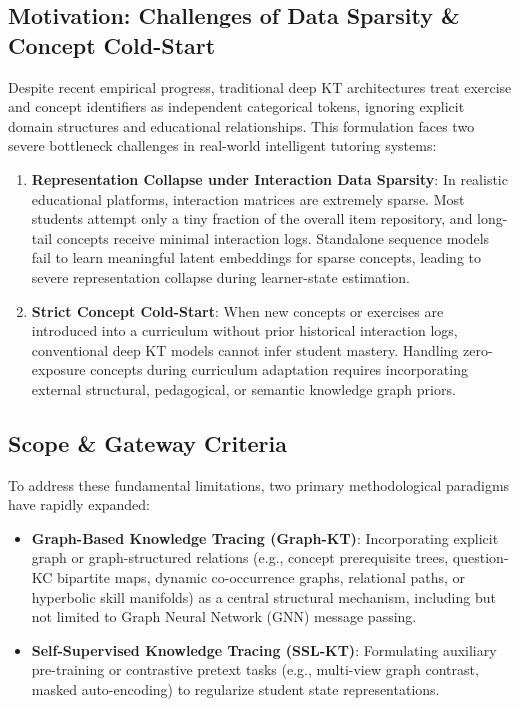 \documentclass[10pt,journal,compsoc]{IEEEtran}
\begin{document}
\subsection{Motivation: Challenges of Data Sparsity \& Concept Cold-Start}
Despite recent empirical progress, traditional deep KT architectures treat exercise and concept identifiers as independent categorical tokens, ignoring explicit domain structures and educational relationships. This formulation faces two severe bottleneck challenges in real-world intelligent tutoring systems:
\begin{enumerate}
    \item \textbf{Representation Collapse under Interaction Data Sparsity}: In realistic educational platforms, interaction matrices are extremely sparse. Most students attempt only a tiny fraction of the overall item repository, and long-tail concepts receive minimal interaction logs. Standalone sequence models fail to learn meaningful latent embeddings for sparse concepts, leading to severe representation collapse during learner-state estimation.
    \item \textbf{Strict Concept Cold-Start}: When new concepts or exercises are introduced into a curriculum without prior historical interaction logs, conventional deep KT models cannot infer student mastery. Handling zero-exposure concepts during curriculum adaptation requires incorporating external structural, pedagogical, or semantic knowledge graph priors.
\end{enumerate}

\subsection{Scope \& Gateway Criteria}
To address these fundamental limitations, two primary methodological paradigms have rapidly expanded:
\begin{itemize}
    \item \textbf{Graph-Based Knowledge Tracing (Graph-KT)}: Incorporating explicit graph or graph-structured relations (e.g., concept prerequisite trees, question-KC bipartite maps, dynamic co-occurrence graphs, relational paths, or hyperbolic skill manifolds) as a central structural mechanism, including but not limited to Graph Neural Network (GNN) message passing.
    \item \textbf{Self-Supervised Knowledge Tracing (SSL-KT)}: Formulating auxiliary pre-training or contrastive pretext tasks (e.g., multi-view graph contrast, masked auto-encoding) to regularize student state representations.
\end{itemize}
\end{document}
